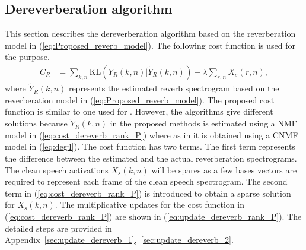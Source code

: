 \subsection{Dereverberation algorithm}
This section describes the dereverberation algorithm based on the reverberation model in (\ref{eq:Proposed_reverb_model}). The following cost function is used for the purpose. 
\begin{align}
C_R &= \sum_{k,n} \text{KL}(Y_R(k,n)|\tilde{Y}_R(k,n)) + \lambda \sum_{r,n} X_s(r,n),
\label{eq:cost_dereverb_rank_P}
\end{align}
where $\tilde{Y}_R(k,n)$ represents the estimated reverb spectrogram based on the reverberation model in (\ref{eq:Proposed_reverb_model}).  The proposed cost function is similar to one used for . However, the algorithms give different solutions because $\tilde{Y}_R(k, n)$ in the proposed methods is estimated using a NMF model in (\ref{eq:cost_dereverb_rank_P}) where as in  it is obtained using a CNMF model in (\ref{eq:deg4}). The cost function has two terms. The first term represents the difference between the estimated and the actual reverberation spectrograms. The clean speech activations $X_s(k, n)$ will be spares as a few bases vectors are required to represent each frame of the clean speech spectrogram. The second term in (\ref{eq:cost_dereverb_rank_P}) is introduced to obtain a sparse solution for $X_s(k, n)$. The multiplicative updates for the cost function in (\ref{eq:cost_dereverb_rank_P}) are shown in (\ref{eq:update_dereverb_rank_P}). The detailed steps are provided in Appendix~\ref{sec:update_dereverb_1},~\ref{sec:update_dereverb_2}.

